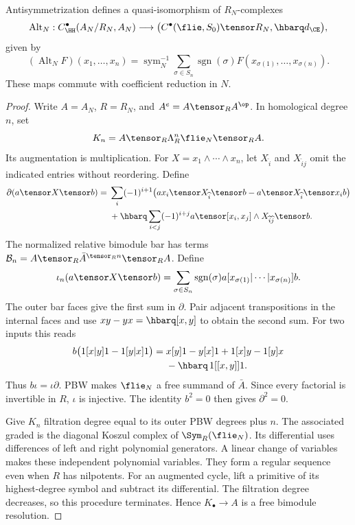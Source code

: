 \begin{theorem}\label{thm:vol2-relative-rees}
Antisymmetrization defines a quasi-isomorphism of $R_N$-complexes
\[
 \operatorname{Alt}_N:
 C^\bullet_{\HH}(A_N/R_N,A_N)
 \longrightarrow
 \bigl(C^\bullet(\flie,S_0)\tensor R_N,\hbarq d_{\CE}\bigr),
\]
given by
\[
 (\operatorname{Alt}_NF)(x_1,\ldots,x_n)
 =\operatorname{sym}_N^{-1}
 \sum_{\sigma\in S_n}\operatorname{sgn}(\sigma)
 F(x_{\sigma(1)},\ldots,x_{\sigma(n)}).
\]
These maps commute with coefficient reduction in $N$.
\end{theorem}
\begin{proof}
Write $A=A_N$, $R=R_N$, and $A^e=A\tensor_R A^{\op}$.
In homological degree $n$, set
\[
 K_n=A\tensor_R\Lambda_R^n\flie_N\tensor_R A.
\]
Its augmentation is multiplication.
For $X=x_1\wedge\cdots\wedge x_n$, let $X_{\widehat i}$ and
$X_{\widehat i\widehat j}$ omit the indicated entries without reordering.
Define
\[
\begin{split}
 \partial(a\tensor X\tensor b)
 ={}&\sum_i(-1)^{i+1}
 \bigl(ax_i\tensor X_{\widehat i}\tensor b
       -a\tensor X_{\widehat i}\tensor x_i b\bigr)\\
 &+\hbarq\sum_{i<j}(-1)^{i+j}
 a\tensor[x_i,x_j]\wedge X_{\widehat i\widehat j}\tensor b.
\end{split}
\]
The normalized relative bimodule bar has terms
$\mathcal B_n=A\tensor_R\bar A^{\tensor_R n}\tensor_R A$.
Define
\[
 \iota_n(a\tensor X\tensor b)
 =\sum_{\sigma\in S_n}\operatorname{sgn}(\sigma)
       a[x_{\sigma(1)}|\cdots|x_{\sigma(n)}]b.
\]
The outer bar faces give the first sum in $\partial$.
Pair adjacent transpositions in the internal faces and use
$xy-yx=\hbarq[x,y]$ to obtain the second sum.
For two inputs this reads
\[
\begin{split}
 b\bigl(1[x|y]1-1[y|x]1\bigr)
 ={}&x[y]1-y[x]1+1[x]y-1[y]x\\
 &-\hbarq\,1[[x,y]]1.
\end{split}
\]
Thus $b\iota=\iota\partial$.
PBW makes $\flie_N$ a free summand of $\bar A$.
Since every factorial is invertible in $R$, $\iota$ is injective.
The identity $b^2=0$ then gives $\partial^2=0$.

Give $K_n$ filtration degree equal to its outer PBW degrees plus $n$.
The associated graded is the diagonal Koszul complex of
$\Sym_R(\flie_N)$.
Its differential uses differences of left and right polynomial generators.
A linear change of variables makes these independent polynomial variables.
They form a regular sequence even when $R$ has nilpotents.
For an augmented cycle, lift a primitive of its highest-degree symbol
and subtract its differential.
The filtration degree decreases, so this procedure terminates.
Hence $K_\bullet\to A$ is a free bimodule resolution.


\end{proof}

